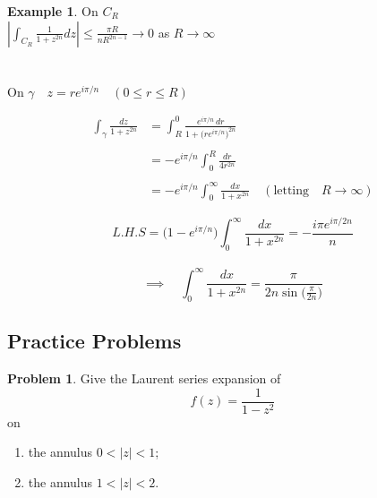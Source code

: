 \documentclass[11pt,a4paper]{article}
\theoremstyle{definition}
\newtheorem{example}[thm]{Example}
\newtheorem{problemx}{Problem}[section]
\newenvironment{problem}{\begin{problemx}}{\end{problemx}}
\begin{document}
\begin{example}
On $C_R$\\

$\displaystyle{\left|\displaystyle{\int_{C_R} \frac{1}{1 + z^{2n}}dz}\right|\leq \frac{\pi R}{nR^{2n - 1}}\longrightarrow 0
}$ as $R\longrightarrow \infty$\\\\\\




On $\gamma \quad  z = re^{i\pi/ n}\quad  (0\leq r\leq R)$

\begin{align*}
\int_{\gamma} \frac{dz}{1 + z^{2n}} & = \int^0_R\frac{e^{i\pi/n}\,dr}{1 + \Big(re^{i\pi/n}\Big)^{2n}}\\\\
& = -e^{i\pi/n}\int^R_0\frac{dr}{4r^{2n}}\\\\
& = -e^{i\pi/n}\int_0^{\infty} \frac{dx}{1 + x^{2n}}\quad  (\text{letting}\quad R\longrightarrow \infty)
\end{align*}

$$L.H.S = \Big(1 - e^{i\pi/n}\Big) \int^{\infty}_0 \frac{dx}{1 + x^{2n}} = -\frac{i\pi e^{i\pi/2n}}{n}$$\\




$$\implies \quad  \int^{\infty}_0 \frac{dx}{1 + x^{2n}} = \frac{\pi}{2n\sin\Big(\frac{\pi}{2n}\Big)}$$
\end{example}

{\color[wave]{485}\subsection{Practice Problems}}

\begin{problem}
Give the Laurent series expansion of
$$f(z) = \frac{1}{1 - z^{2}}$$
on
\begin{enumerate}
\item[(a).] the annulus $0 < \left|z\right| < 1$;
\item[(b).] the annulus $1 < \left|z\right| < 2$.
\end{enumerate}
\end{problem}
\end{document}
